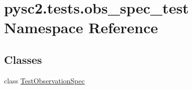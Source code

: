 \hypertarget{namespacepysc2_1_1tests_1_1obs__spec__test}{}\section{pysc2.\+tests.\+obs\+\_\+spec\+\_\+test Namespace Reference}
\label{namespacepysc2_1_1tests_1_1obs__spec__test}
\subsection*{Classes}
\begin{DoxyCompactItemize}
\item 
class \mbox{\hyperlink{classpysc2_1_1tests_1_1obs__spec__test_1_1_test_observation_spec}{Test\+Observation\+Spec}}
\end{DoxyCompactItemize}
